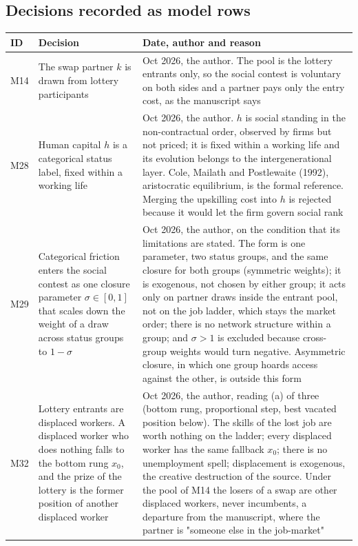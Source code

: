 \documentclass[10pt]{article}
\begin{document}
\subsection*{Decisions recorded as model rows}
{\small
\begin{longtable}{>{\raggedright\arraybackslash}p{0.9cm} >{\raggedright\arraybackslash}p{9.0cm} >{\raggedright\arraybackslash}p{13.0cm}}
\toprule ID & Decision & Date, author and reason \\ \midrule \endhead
M14 & The swap partner $k$ is drawn from lottery participants & 10 Oct 2026, the author. The pool is the lottery entrants only, so the social contest is voluntary on both sides and a partner pays only the entry cost, as the manuscript says \\ \midrule
M28 & Human capital $h$ is a categorical status label, fixed within a working life & 11 Oct 2026, the author. $h$ is social standing in the non-contractual order, observed by firms but not priced; it is fixed within a working life and its evolution belongs to the intergenerational layer. Cole, Mailath and Postlewaite (1992), aristocratic equilibrium, is the formal reference. Merging the upskilling cost into $h$ is rejected because it would let the firm govern social rank \\ \midrule
M29 & Categorical friction enters the social contest as one closure parameter $\sigma\in[0,1]$ that scales down the weight of a draw across status groups to $1-\sigma$ & 11 Oct 2026, the author, on the condition that its limitations are stated. The form is one parameter, two status groups, and the same closure for both groups (symmetric weights); it is exogenous, not chosen by either group; it acts only on partner draws inside the entrant pool, not on the job ladder, which stays the market order; there is no network structure within a group; and $\sigma>1$ is excluded because cross-group weights would turn negative. Asymmetric closure, in which one group hoards access against the other, is outside this form \\ \midrule
M32 & Lottery entrants are displaced workers. A displaced worker who does nothing falls to the bottom rung $x_0$, and the prize of the lottery is the former position of another displaced worker & 12 Oct 2026, the author, reading (a) of three (bottom rung, proportional step, best vacated position below). The skills of the lost job are worth nothing on the ladder; every displaced worker has the same fallback $x_0$; there is no unemployment spell; displacement is exogenous, the creative destruction of the source. Under the pool of M14 the losers of a swap are other displaced workers, never incumbents, a departure from the manuscript, where the partner is "someone else in the job-market" \\ \midrule

\end{longtable}}
\end{document}

